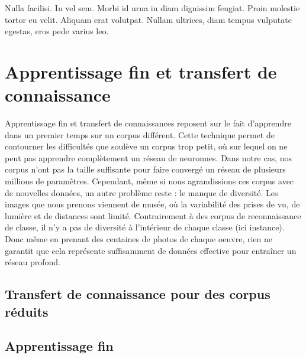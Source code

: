 \begin{savequote}[75mm] 
Nulla facilisi. In vel sem. Morbi id urna in diam dignissim feugiat. Proin molestie tortor eu velit. Aliquam erat volutpat. Nullam ultrices, diam tempus vulputate egestas, eros pede varius leo.
\end{savequote}

\chapter{Apprentissage fin et transfert de connaissance}

Apprentissage fin et transfert de connaissances reposent sur le fait d'apprendre dans un premier temps sur un corpus différent.
Cette technique permet de contourner les difficultés que soulève un corpus trop petit, où sur lequel on ne peut pas apprendre complètement un réseau de neuronnes. 
Dans notre cas, nos corpus n'ont pas la taille suffisante pour faire convergé un réseau de plusieurs millions de paramêtres. Cependant, même si nous agrandissions ces corpus avec de nouvelles données, un autre problème reste : le manque de diversité.
Les images que nous prenons viennent de musée, où la variabilité des prises de vu, de lumière et de distances sont limité. Contrairement à des corpus de reconnaissance de classe, il n'y a pas de diversité à l'intérieur de 
chaque classe (ici instance). Donc même en prenant des centaines de photos de chaque oeuvre, rien ne garantit que cela représente suffisamment de données effective pour entraîner un réseau profond.



\section{Transfert de connaissance pour des corpus réduits}

\section{Apprentissage fin}

